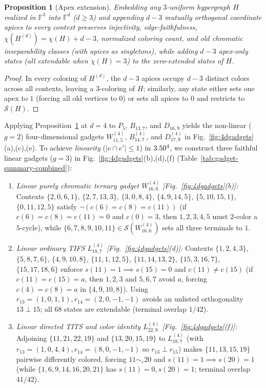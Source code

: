 \documentclass[aps,pra,reprint,superscriptaddress,longbibliography,nofootinbib,floatfix,10pt]{revtex4-2}
\newtheorem{proposition}[theorem]{Proposition}
\theoremstyle{definition}\newtheorem{definition}[theorem]{Definition}
\theoremstyle{remark}\newtheorem{remark}[theorem]{Remark}
\newcommand{\F}{\mathbb F}\newcommand{\Z}{\mathbb Z}\newcommand{\PP}{\mathbb P}
\newcommand{\Sc}{\mathcal S}\newcommand{\Cc}{\mathcal C}
\begin{document}
\begin{proposition}[Apex extension]\label{prop:apex}
Embedding any $3$-uniform hypergraph $H$ realized in $\F^3$ into $\F^d$ ($d\ge3$) and appending $d-3$ mutually orthogonal coordinate apices to every context preserves injectivity, edge-faithfulness, $\chi(H^{(d)})=\chi(H)+d-3$, normalized coloring count, and old chromatic inseparability classes (with apices as singletons), while adding $d-3$ apex-only states (all extendable when $\chi(H)=3$) to the zero-extended states of $H$.
\end{proposition}
\begin{proof}
In every coloring of $H^{(d)}$, the $d-3$ apices occupy $d-3$ distinct colors across all contexts, leaving a $3$-coloring of $H$; similarly, any state either sets one apex to $1$ (forcing all old vertices to $0$) or sets all apices to $0$ and restricts to $\Sc(H)$.
\end{proof}

Applying Proposition~\ref{prop:apex} at $d=4$ to $P_5$, $B_{13,7}$, and $D_{16,9}$ yields the non-linear ($g=2$) four-dimensional gadgets $W_{11,5}^{(4)}$, $B_{14,7}^{(4)}$, and $D_{17,9}^{(4)}$ in Fig.~\ref{fig:4dgadgets}(a),(c),(e). To achieve \emph{linearity} ($|e\cap e'|\le1$) in $3.50^4$, we construct three faithful linear gadgets ($g=3$) in Fig.~\ref{fig:4dgadgets}(b),(d),(f) (Table~\ref{tab:gadget-summary-combined}):
\begin{enumerate}
\item \emph{Linear purely chromatic ternary gadget $W_{16,6}^{(4)}$ [Fig.~\ref{fig:4dgadgets}(b)]:} Contexts $\{2,0,6,1\}$, $\{2,7,13,3\}$, $\{3,0,8,4\}$, $\{4,9,14,5\}$, $\{5,10,15,1\}$, $\{0,11,12,5\}$ satisfy $\neg(c(6)=c(8)=c(11))$ (if $c(6)=c(8)=c(11)=0$ and $c(0)=3$, then $1,2,3,4,5$ must $2$-color a $5$-cycle), while $\{6,7,8,9,10,11\}\in\Sc(W_{16,6}^{(4)})$ sets all three terminals to $1$.
\item \emph{Linear ordinary TIFS $L_{18,7}^{(4)}$ [Fig.~\ref{fig:4dgadgets}(d)]:} Contexts $\{1,2,4,3\}$, $\{5,8,7,6\}$, $\{4,9,10,8\}$, $\{11,1,12,5\}$, $\{11,14,13,2\}$, $\{15,3,16,7\}$, $\{15,17,18,6\}$ enforce $s(11)=1\implies s(15)=0$ and $c(11)\ne c(15)$ (if $c(11)=c(15)=a$, then $1,2,3$ and $5,6,7$ avoid $a$, forcing $c(4)=c(8)=a$ in $\{4,9,10,8\}$). Using $r_{13}=(1,0,1,1),r_{14}=(2,0,-1,-1)$ avoids an unlisted orthogonality $13\perp 15$; all $68$ states are extendable (terminal overlap $1/42$).
\item \emph{Linear directed TITS and color identity $L_{22,9}^{(4)}$ [Fig.~\ref{fig:4dgadgets}(f)]:} Adjoining $\{11,21,22,19\}$ and $\{13,20,15,19\}$ to $L_{18,7}^{(4)}$ (with $r_{13}=(1,0,4,4),r_{14}=(8,0,-1,-1)$ so $r_{13}\perp r_{15}$) makes $\{11,13,15,19\}$ pairwise differently colored, forcing $11\sim_c 20$ and $s(11)=1\implies s(20)=1$ (while $\{1,6,9,14,16,20,21\}$ has $s(11)=0,s(20)=1$; terminal overlap $41/42$).
\end{enumerate}
\end{document}
